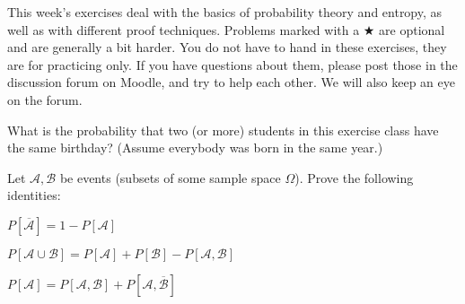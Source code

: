 \documentclass[a4paper,10pt,landscape,twocolumn]{scrartcl}
\newcommand\deadline{Friday November 11th, 20:00h}
\begin{document}
\practiceproblems

{\sffamily\noindent
This week's exercises deal with the basics of probability theory and entropy, as well as with different proof techniques. Problems marked with a $\bigstar$ are optional and are generally a bit harder. You do not have to hand in these exercises, they are for practicing only. If you have questions about them, please post those in the discussion forum on Moodle, and try to help each other. We will also keep an eye on the forum.
}

\begin{exercise}
What is the probability that two (or more) students in this exercise class have the same birthday? (Assume everybody was born in the same year.)
\end{exercise}

\begin{exercise}[Events]
Let $\mathcal{A}, \mathcal{B}$ be events (subsets of some sample space $\Omega$). Prove the following identities:
	\begin{subex}
	$P[\overline{\mathcal{A}}] = 1 - P[\mathcal{A}]$
	\end{subex}
	
	\begin{subex}
	$P[\mathcal{A} \cup \mathcal{B}] = P[\mathcal{A}] + P[\mathcal{B}] - P[\mathcal{A},\mathcal{B}]$
	\end{subex}
	
	\begin{subex}
	$P[\mathcal{A}] = P[\mathcal{A},\mathcal{B}] + P[\mathcal{A},\overline{\mathcal{B}}]$
	\end{subex}
\end{exercise}
\end{document}
